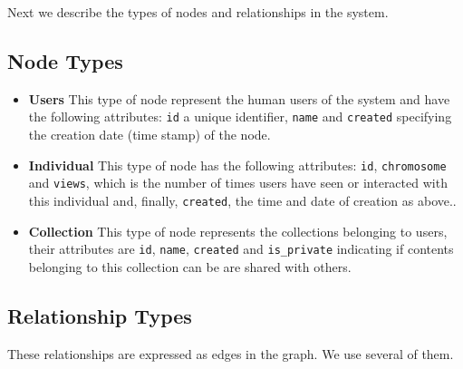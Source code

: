 \documentclass[conference]{IEEEtran}
\begin{document}
Next we describe the types of nodes and
relationships in the system. %

\subsection{Node Types}
\begin{itemize}

\item {\bf Users} This type of node represent the human users of the system and have 
the following attributes: {\tt id} a unique identifier, {\tt name}  and {\tt created}
specifying the  creation date (time stamp) of the node. 

\item {\bf Individual} This type of node has the following attributes: 
{\tt id}, {\tt chromosome}  and {\tt views}, which is the number of
times users have seen or interacted with this individual and, finally, 
 {\tt created}, the time and date of creation as above..

\item {\bf Collection} This type of node represents the collections belonging
to users, their attributes are {\tt id}, 
{\tt name}, {\tt created} and {\tt is\_private} indicating if contents
belonging to this collection can be are shared with others. 
\end{itemize}


\subsection{Relationship Types}

These relationships are expressed as edges in the graph. We use
several of them.
\end{document}
